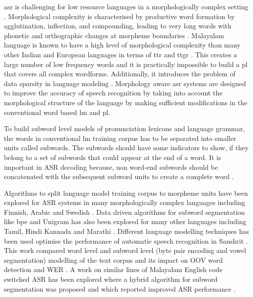 \gls{asr} is challenging for low resource languages in
a morphologically complex setting \cite{besacier2014automatic}. Morphological
complexity is characterised by productive word formation by agglutination,
inflection, and compounding, leading to very long words with phonetic and
orthographic changes at morpheme boundaries \cite{baerman2015understanding}.
Malayalam language is known to have a high level of morphological complexity
than many other Indian and European languages in terms of \gls{ttr} and
\gls{ttgr} \cite{bharadwaja2007statistical,manohar_quantitative_2020}. This creates a large number of low frequency words and it is practically impossible to build a \gls{pl} that covers all complex wordforms. Additionally, it
introduces the problem of data sparsity in language modeling
\cite{SMIT2021101158}. Morphology aware \gls{asr} systems are designed to improve the accuracy of speech recognition by taking into account the morphological structure of the language by making sufficient modifications in the conventional word based \gls{lm} and \gls{pl}.

To build subword level models of pronunciation lexicons and language grammar, the words in conventional \gls{lm} training corpus has to be separated into smaller units called subwords. The subwords should have some indicators to show, if they belong to a set of subwords that could appear at the end of a word. It is important in ASR decoding because, non word-end subwords should be concatenated with the subsequent subword units to create a complete word \cite{smit17_interspeech}.

Algorithms to split language model training corpus to morpheme units have been explored for ASR systems in many morphologically complex languages including Finnish, Arabic and Swedish \cite{creutz2007analysis, SMIT2021101158}. Data driven algorithms for subword segmentation like \gls{bpe} and Unigram has also been explored for many other languages including Tamil, Hindi  Kannada and Marathi \cite{madhavaraj2020strategies, yadavalli2022investigation, pilar2022subword}. Different language modelling techniques has been used optimise the performance of automatic speech recognition in Sanskrit \cite{adiga-etal-2021-automatic}. This
work compared word level and subword level (byte pair encoding and vowel segmentation) modelling of the text corpus and its impact on OOV word detection and WER \cite{adiga-etal-2021-automatic}. A work on similar lines of Malayalam English code switched ASR has been explored where a hybrid algorithm for subword segmentation was proposed and which reported improved ASR performance \cite{sreeja-hybrid-2022}.

